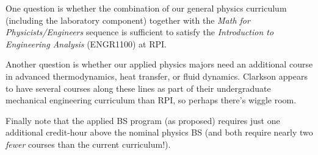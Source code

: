 \documentclass[12pt,preprint]{aastex}
\begin{document}
\vspace{-4mm}
\begin{itemize*}
\item{One question is whether the combination of our general physics curriculum
  (including the laboratory component) together with the {\em Math for
    Physicists/Engineers} sequence is sufficient to satisfy the {\em
    Introduction to Engineering Analysis} (ENGR1100) at RPI.}
\item{Another question is whether our applied physics majors need an additional
  course in advanced thermodynamics, heat transfer, or fluid dynamics.  Clarkson
  appears to have several courses along these lines as part of their
  undergraduate mechanical engineering curriculum than RPI, so perhaps there's
  wiggle room.}
\item{Finally note that the applied BS program (as proposed) requires just one
  additional credit-hour above the nominal physics BS (and both require nearly
  two \emph{fewer} courses than the current curriculum!).} 
\end{itemize*}
 
%
%
%

\end{document}
